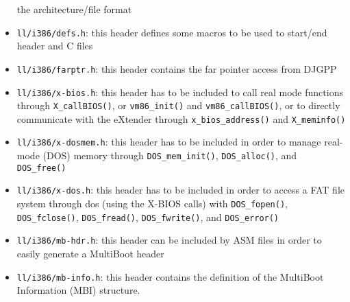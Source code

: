 \documentclass[a4paper]{report}
\begin{document}
\begin{itemize}
		the architecture/file format
	\item {\tt ll/i386/defs.h}: this header defines some macros to be
		used to start/end header and C files
	\item {\tt ll/i386/farptr.h}: this header contains the far pointer
		access from DJGPP
	\item {\tt ll/i386/x-bios.h}: this header has to be included to
		call real mode functions through {\tt X\_callBIOS()}, or
		{\tt vm86\_init()} and {\tt vm86\_callBIOS()}, or to
		directly communicate with the eXtender through
		{\tt x\_bios\_address()} and {\tt X\_meminfo()}
	\item {\tt ll/i386/x-dosmem.h}: this header has to be included in
		order to manage real-mode (DOS) memory through
		{\tt DOS\_mem\_init()}, {\tt DOS\_alloc()}, and
		{\tt DOS\_free()}
	\item {\tt ll/i386/x-dos.h}: this header has to be included in
		order to access a FAT file system through dos (using the
		X-BIOS calls) with {\tt DOS\_fopen()},
		{\tt DOS\_fclose()}, {\tt DOS\_fread()},
		{\tt DOS\_fwrite()}, and {\tt DOS\_error()}
	\item {\tt ll/i386/mb-hdr.h}: this header can be included by ASM
		files in order to easily generate a MultiBoot header
	\item {\tt ll/i386/mb-info.h}: this header contains the definition
		of the MultiBoot Information (MBI) structure.
\end{itemize}

\end{document}
